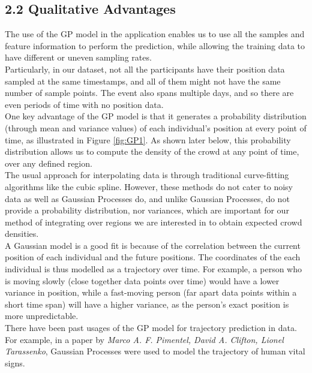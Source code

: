 \documentclass[letterpaper]{article}
\begin{document}
\subsection{2.2  Qualitative Advantages}

The use of the GP model in the application enables us to use all the samples and feature information to perform the prediction, while allowing the training data to have different or uneven sampling rates. \\

Particularly, in our dataset, not all the participants have their position data sampled at the same timestamps, and all of them might not have the same number of sample points. The event also spans multiple days, and so there are even periods of time with no position data.\\

One key advantage of the GP model is that it generates a probability distribution (through mean and variance values) of each individual's position at every point of time, as illustrated in Figure \ref{fig:GP1}. As shown later below, this probability distribution allows us to compute the density of the crowd at any point of time, over any defined region. \\

The usual approach for interpolating data is through traditional curve-fitting algorithms like the cubic spline. However, these methods do not cater to noisy data as well as Gaussian Processes do, and unlike Gaussian Processes, do not provide a probability distribution, nor variances, which are important for our method of integrating over regions we are interested in to obtain expected crowd densities.\\

A Gaussian model is a good fit is because of the correlation between the current position of each individual and the future positions. The coordinates of the each individual is thus modelled as a trajectory over time. For example, a person who is moving slowly (close together data points over time) would have a lower variance in position, while a fast-moving person (far apart data points within a short time span) will have a higher variance, as the person's exact position is more unpredictable. \\

There have been past usages of the GP model for trajectory prediction in data. For example, in a paper by {\it Marco A. F. Pimentel, David A. Clifton, Lionel Tarassenko}, Gaussian Processes were used to model the trajectory of human vital signs.
\end{document}
